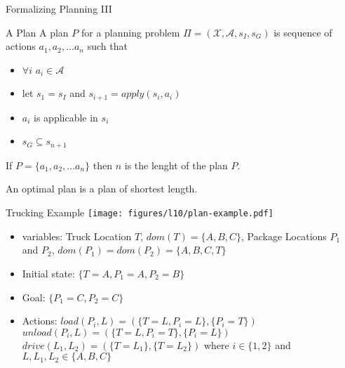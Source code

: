 \documentclass[t]{sdqbeamer}
\begin{document}
\begin{frame}{Formalizing Planning III}
\begin{block}{A Plan}
A plan $P$ for a planning problem $\Pi = (\mathcal{X}, \mathcal{A}, s_I, s_G)$ is sequence of
actions $a_1, a_2, \dots a_n$ such that
\begin{itemize}
	\item $\forall i$ $a_i \in \mathcal{A}$
	\item let $s_1 = s_I$ and $s_{i+1} = apply(s_i,a_i)$
	\item $a_i$ is applicable in $s_i$
	\item $s_G \subseteq s_{n+1}$
\end{itemize}
If $P=\{a_1, a_2, \dots a_n\}$ then $n$ is the lenght of the plan $P$.
\end{block}
An optimal plan is a plan of shortest length.
\end{frame}

\begin{frame}{Trucking Example}
\texttt{[image: figures/l10/plan-example.pdf]}
\begin{itemize}
	\item variables: Truck Location $T$, $dom(T)=\{A,B,C\}$, Package Locations $P_1$ and $P_2$,
	$dom(P_1)=dom(P_2)=\{A,B,C,T\}$
	\item Initial state: $\{T=A, P_1=A, P_2=B\}$
	\item Goal: $\{P_1=C, P_2=C\}$
	\item Actions: $load(P_i,L) = (\{T=L, P_i=L\}, \{P_i=T\})$
	$unload(P_i,L) = (\{T=L, P_i=T\}, \{P_i=L\})$
	$drive(L_1,L_2) = (\{T=L_1\},\{T=L_2\})$ where $i\in\{1,2\}$ and $L,L_1,L_2\in \{A,B,C\}$
\end{itemize}
\end{frame}
\end{document}
